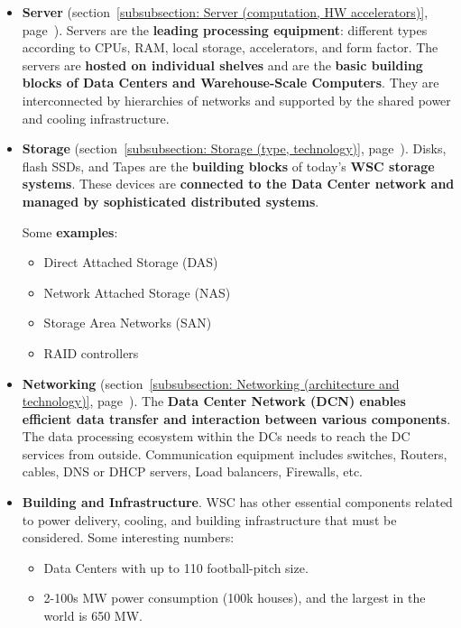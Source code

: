 \documentclass[a4paper]{article}
\newcommand{\example}[1]{\textcolor{Green4}{\textbf{#1}}}
\begin{document}
    \begin{itemize}
        \item \textbf{Server} (section~\ref{subsubsection: Server (computation, HW accelerators)}, page~\pageref{subsubsection: Server (computation, HW accelerators)}). Servers are the \textbf{leading processing equipment}: different types according to CPUs, RAM, local storage, accelerators, and form factor. The servers are \textbf{hosted on individual shelves} and are the \textbf{basic building blocks of Data Centers and Warehouse-Scale Computers}. They are interconnected by hierarchies of networks and supported by the shared power and cooling infrastructure.

        \item \textbf{Storage} (section~\ref{subsubsection: Storage (type, technology)}, page~\pageref{subsubsection: Storage (type, technology)}). Disks, flash SSDs, and Tapes are the \textbf{building blocks} of today's \textbf{WSC storage systems}. These devices are \textbf{connected to the Data Center network and managed by sophisticated distributed systems}.
        
        Some \example{examples}:
        \begin{itemize}
            \item Direct Attached Storage (DAS)

            \item Network Attached Storage (NAS)

            \item Storage Area Networks (SAN)

            \item RAID controllers
        \end{itemize}

        \item \textbf{Networking} (section~\ref{subsubsection: Networking (architecture and technology)}, page~\pageref{subsubsection: Networking (architecture and technology)}). The \textbf{Data Center Network (DCN) enables efficient data transfer and interaction between various components}. The data processing ecosystem within the DCs needs to reach the DC services from outside.
        Communication equipment includes switches, Routers, cables, DNS or DHCP servers, Load balancers, Firewalls, etc.

        \item \textbf{Building and Infrastructure}. WSC has other essential components related to power delivery, cooling, and building infrastructure that must be considered. Some interesting numbers:
        \begin{itemize}
            \item Data Centers with up to 110 football-pitch size.
            
            \item 2-100s MW power consumption (100k houses), and the largest in the world is 650 MW.
        \end{itemize}
    \end{itemize}
\end{document}
